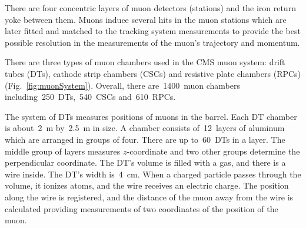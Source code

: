 There are four concentric layers of muon detectors (stations) and the iron return yoke between them. Muons induce several hits in the muon stations which are later fitted and matched to the tracking system measurements to provide the best possible resolution in the measurements of the muon's trajectory and momentum.

There are three types of muon chambers used in the CMS muon system: drift tubes (DTs), cathode strip chambers (CSCs) and resistive plate chambers (RPCs) (Fig.~\ref{fig:muonSystem}). Overall, there are~1400~muon chambers including~250~DTs,~540~CSCs and~610~RPCs.

The system of DTs measures positions of muons in the barrel. Each DT chamber is about~2~m by~2.5~m in size. A chamber consists of~12~layers of aluminum which are arranged in groups of four. There are up to~60~DTs in a layer. The middle group of layers measures $z$-coordinate and two other groups determine the perpendicular coordinate. The DT's volume is filled with a gas, and there is a wire inside. The DT's width is~4~cm. When a charged particle passes through the volume, it ionizes atoms, and the wire receives an electric charge. The position along the wire is registered, and the distance of the muon away from the wire is calculated providing measurements of two coordinates of the position of the muon.

